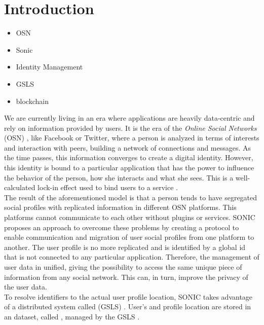 \section{Introduction}
\label{S:1}

\begin{itemize}
  \item OSN
  \item Sonic
  \item Identity Management
  \item GSLS
  \item blockchain
\end{itemize}

We are currently living in an era where applications are heavily data-centric and rely on information provided by users. It is the era of the \textit{Online Social Networks} (OSN) \cite{gondor_sonic:_2014}, like Facebook or Twitter, where a person is analyzed in terms of interests and interaction with peers, building a network of connections and messages. As the time passes, this information converges to create a digital identity. However, this identity is bound to a particular application that has the power to influence the behavior of the person, how she interacts and what she sees. This is a well-calculated lock-in effect used to bind users to a service \cite{gondor_distributed_2016}. 
\\

The result of the aforementioned model is that a person tends to have segregated social profiles with replicated information in different OSN platforms. This platforms cannot communicate to each other without plugins or services. SONIC proposes an approach to overcome these problems by creating a protocol to enable communication and migration of user social profiles from one platform to another. The user profile is no more replicated and is identified by a global id that is not connected to any particular application. Therefore, the management of user data in unified, giving the possibility to access the same unique piece of information from any social network. This can, in turn, improve the privacy of the user data. 
\\

To resolve identifiers to the actual user profile location, SONIC takes advantage of a distributed system called (GSLS) \cite{gondor_distributed_2016}. User's  and profile location are stored in an dataset, called , managed by the GSLS \cite{gondor_distributed_2016}.
\\

